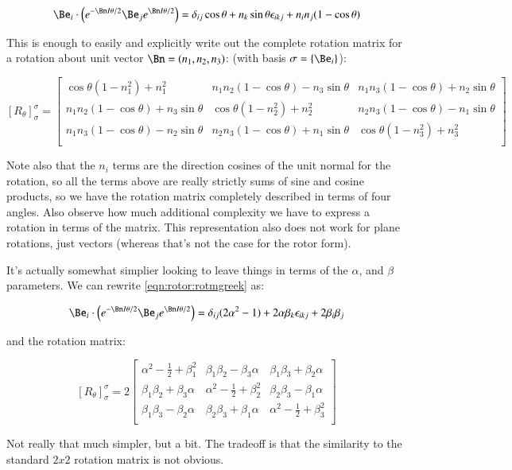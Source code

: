 \begin{equation}\label{eqn:rotor:rotmn}
\Be_i \cdot \left(e^{-\Bn I \theta/2} \Be_j e^{\Bn I \theta/2}\right)
= \delta_{ij}\cos\theta
+ n_k \sin{\theta} \epsilon_{ikj} + n_i n_j (1-\cos\theta)
\end{equation}

This is enough to easily and explicitly write out the complete rotation matrix for a rotation about unit vector $\Bn = (n_1, n_2, n_3)$:
(with basis $\sigma = \{\Be_i\}$):

\[
[
R_\theta
]_\sigma^\sigma
=
\begin{bmatrix}
\cos\theta(1 -n_1^2) + n_1^2 & n_1 n_2 (1-\cos\theta) - n_3 \sin\theta & n_1 n_3 (1-\cos\theta) + n_2 \sin\theta \\
n_1 n_2 (1-\cos\theta) + n_3 \sin\theta & \cos\theta(1 -n_2^2) + n_2^2 & n_2 n_3 (1-\cos\theta) - n_1 \sin\theta \\
n_1 n_3 (1-\cos\theta) - n_2 \sin\theta & n_2 n_3 (1-\cos\theta) + n_1 \sin\theta & \cos\theta(1 -n_3^2) + n_3^2 \\
\end{bmatrix}
\]

Note also that the $n_i$ terms are the direction cosines of the unit normal for the rotation, so all the terms above
are really strictly sums of sine and cosine products, so we have the rotation matrix completely described in terms of four
angles.  Also observe how much additional complexity we have to express a rotation in terms of the matrix.  This representation also
does not work for plane rotations, just vectors (whereas that's not the case for the rotor form).

It's actually somewhat simplier looking to leave things in terms of the $\alpha$, and $\beta$ parameters.  We can rewrite
\ref{eqn:rotor:rotmgreek} as:

\begin{equation}
\Be_i \cdot \left(e^{-\Bn I \theta/2} \Be_j e^{\Bn I \theta/2}\right)
= \delta_{ij}(2\alpha^2 -1)
+2\alpha \beta_k \epsilon_{ikj} + 2\beta_i\beta_j
\end{equation}

and the rotation matrix:

\[
[
R_\theta
]_\sigma^\sigma
=
2
\begin{bmatrix}
\alpha^2 -\frac{1}{2} + \beta_1^2 & \beta_1 \beta_2  - \beta_3 \alpha & \beta_1 \beta_3  + \beta_2 \alpha \\
\beta_1 \beta_2  + \beta_3 \alpha & \alpha^2 -\frac{1}{2} + \beta_2^2 & \beta_2 \beta_3  - \beta_1 \alpha \\
\beta_1 \beta_3  - \beta_2 \alpha & \beta_2 \beta_3  + \beta_1 \alpha & \alpha^2 -\frac{1}{2} + \beta_3^2 \\
\end{bmatrix}
\]

Not really that much simpler, but a bit.  The tradeoff is that the similarity to the standard $2x2$ rotation matrix is not obvious.

